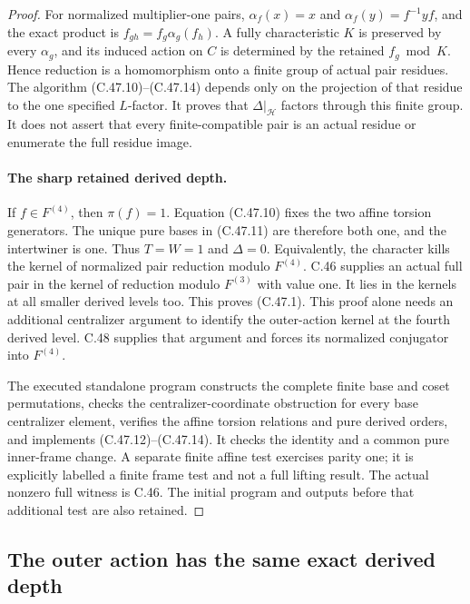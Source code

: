 \begin{proof}
For normalized multiplier-one pairs,
$\alpha_f(x)=x$ and $\alpha_f(y)=f^{-1}yf$, and the exact
product is $f_{gh}=f_g\alpha_g(f_h)$. A fully characteristic $K$ is
preserved by every $\alpha_g$, and its induced action on $C$
is determined by the retained $f_g\bmod K$. Hence reduction
is a homomorphism onto a finite group of actual pair residues.
The algorithm (C.47.10)--(C.47.14) depends only on the projection
of that residue to the one specified $L$-factor. It proves that
$\Delta|_{\mathcal H}$ factors through this finite group.
It does not assert that every finite-compatible pair is an
actual residue or enumerate the full residue image.

\paragraph{The sharp retained derived depth.}
If $f\in F^{(4)}$, then $\pi(f)=1$. Equation (C.47.10)
fixes the two affine torsion generators. The unique pure bases
in (C.47.11) are therefore both one, and the intertwiner is one.
Thus $T=W=1$ and $\Delta=0$. Equivalently, the character kills
the kernel of normalized pair reduction modulo $F^{(4)}$.
C.46 supplies an actual full pair in the kernel of reduction
modulo $F^{(3)}$ with value one. It lies in the kernels at all
smaller derived levels too. This proves (C.47.1).
This proof alone needs an additional centralizer argument to identify
the outer-action kernel at the fourth derived level. C.48 supplies
that argument and forces its normalized conjugator into $F^{(4)}$.

The executed standalone program
constructs the complete finite base and coset permutations,
checks the centralizer-coordinate obstruction for every base
centralizer element, verifies the affine torsion relations and
pure derived orders, and implements (C.47.12)--(C.47.14).
It checks the identity and a common pure inner-frame change.
A separate finite affine test exercises parity one; it is explicitly
labelled a finite frame test and not a full lifting result.
The actual nonzero full witness is C.46. The initial program and
outputs before that additional test are also retained.
\end{proof}



\subsection{The outer action has the same exact derived depth}

